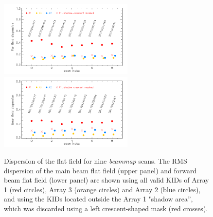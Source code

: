 \begin{figure}[ht] 
\begin{center}
  \includegraphics[width=0.6\textwidth]{Figures/FlatFields/Dispersion_main_beam_flat_field_N2R9_10_.png}
  \includegraphics[width=0.6\textwidth]{Figures/FlatFields/Dispersion_forward_beam_flat_field_N2R9_10_.png}
\caption{Dispersion of the flat field for nine \emph{beammap} scans. The RMS dispersion of the main beam flat field (upper panel) and forward beam flat field (lower panel) are shown using all valid KIDs of Array 1 (red circles), Array 3 (orange circles) and Array 2 (blue circles), and using the KIDs located outside the Array 1 "shadow area'', which was discarded using a left crescent-shaped mask (red crosses).}
 \label{fig:stddev_ff}
\end{center}
\end{figure}
